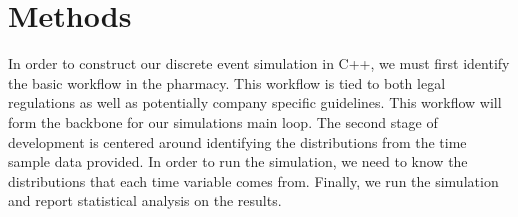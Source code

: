 \documentclass[10pt]{report}            %
\begin{document}
\section*{Methods}
In order to construct our discrete event simulation in C++, we must first identify the basic workflow in the pharmacy. This workflow is tied to both legal regulations as well as potentially company specific guidelines. This workflow will form the backbone for our simulations main loop. The second stage of development is centered around identifying the distributions from the time sample data provided. In order to run the simulation, we need to know the distributions that each time variable comes from. Finally, we run the simulation and report statistical analysis on the results.
\end{document}
